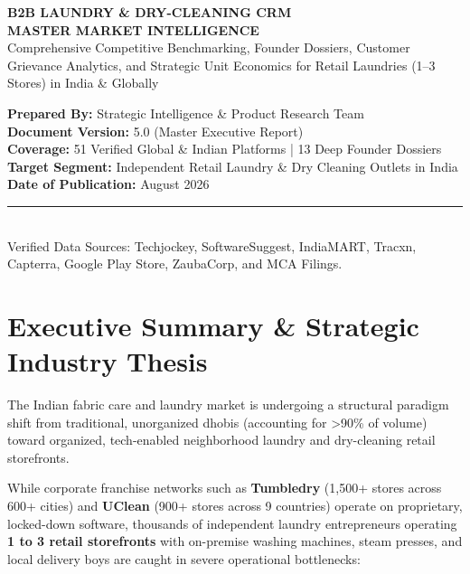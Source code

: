 \documentclass[11pt,a4paper]{article}
\begin{document}
\begin{titlepage}
    \centering
    \vspace*{1.0cm}
    {\Huge\bfseries\color{slate900} B2B LAUNDRY \& DRY-CLEANING CRM\\[0.3em] MASTER MARKET INTELLIGENCE}\\[1.2cm]
    {\Large\color{navyblue} Comprehensive Competitive Benchmarking, Founder Dossiers, Customer Grievance Analytics, and Strategic Unit Economics for Retail Laundries (1--3 Stores) in India \& Globally}\\[1.5cm]
    
    \begin{minipage}{0.85\textwidth}
        \centering
        \textbf{Prepared By:} Strategic Intelligence \& Product Research Team\\
        \textbf{Document Version:} 5.0 (Master Executive Report)\\
        \textbf{Coverage:} 51 Verified Global \& Indian Platforms | 13 Deep Founder Dossiers\\
        \textbf{Target Segment:} Independent Retail Laundry \& Dry Cleaning Outlets in India\\
        \textbf{Date of Publication:} August 2026
    \end{minipage}
    
    \vfill
    {\color{emerald600}\rule{\textwidth}{2.5pt}}\\[0.4cm]
    {\small Verified Data Sources: Techjockey, SoftwareSuggest, IndiaMART, Tracxn, Capterra, Google Play Store, ZaubaCorp, and MCA Filings.}
\end{titlepage}

\tableofcontents
\newpage

\section{Executive Summary \& Strategic Industry Thesis}

The Indian fabric care and laundry market is undergoing a structural paradigm shift from traditional, unorganized dhobis (accounting for >90\% of volume) toward organized, tech-enabled neighborhood laundry and dry-cleaning retail storefronts.

While corporate franchise networks such as \textbf{Tumbledry} (1,500+ stores across 600+ cities) and \textbf{UClean} (900+ stores across 9 countries) operate on proprietary, locked-down software, thousands of independent laundry entrepreneurs operating \textbf{1 to 3 retail storefronts} with on-premise washing machines, steam presses, and local delivery boys are caught in severe operational bottlenecks:
\end{document}
